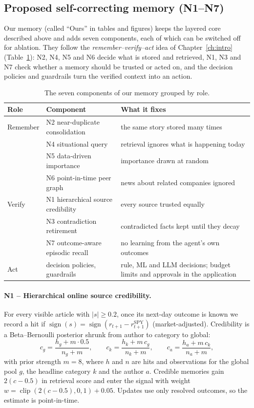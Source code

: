 \subsection{Proposed self-correcting memory (N1--N7)}
Our memory (called ``Ours'' in tables and figures) keeps the layered core described above and adds seven components, each of which can be switched off for ablation. They follow the \emph{remember--verify--act} idea of Chapter~\ref{ch:intro} (Table~\ref{tab:rva}): N2, N4, N5 and N6 decide what is stored and retrieved, N1, N3 and N7 check whether a memory should be trusted or acted on, and the decision policies and guardrails turn the verified context into an action.
\begin{table}[H]
\centering
\caption{The seven components of our memory grouped by role.}
\label{tab:rva}
\small
\begin{tabular}{p{}p{}p{}}
\hline
Role & Component & What it fixes \\
\hline
Remember & N2 near-duplicate consolidation & the same story stored many times \\
 & N4 situational query & retrieval ignores what is happening today \\
 & N5 data-driven importance & importance drawn at random \\
 & N6 point-in-time peer graph & news about related companies ignored \\
\hline
Verify & N1 hierarchical source credibility & every source trusted equally \\
 & N3 contradiction retirement & contradicted facts kept until they decay \\
 & N7 outcome-aware episodic recall & no learning from the agent's own outcomes \\
\hline
Act & decision policies, guardrails & rule, ML and LLM decisions; budget limits and approvals in the application \\
\hline
\end{tabular}
\end{table}

\paragraph{N1 -- Hierarchical online source credibility.} For every visible article with $|s|\ge 0.2$, once its next-day outcome is known we record a hit if $\operatorname{sign}(s)=\operatorname{sign}(r_{t+1}-r^{\text{SPY}}_{t+1})$ (market-adjusted). Credibility is a Beta--Bernoulli posterior shrunk from author to category to global:
\begin{equation}
c_g=\frac{h_g+m\cdot 0.5}{n_g+m},\qquad c_k=\frac{h_k+m\,c_g}{n_k+m},\qquad c_a=\frac{h_a+m\,c_k}{n_a+m},
\end{equation}
with prior strength $m=8$, where $h$ and $n$ are hits and observations for the global pool $g$, the headline category $k$ and the author $a$. Credible memories gain $2(c-0.5)$ in retrieval score and enter the signal with weight $w=\operatorname{clip}(2(c-0.5),0,1)+0.05$. Updates use only resolved outcomes, so the estimate is point-in-time.

